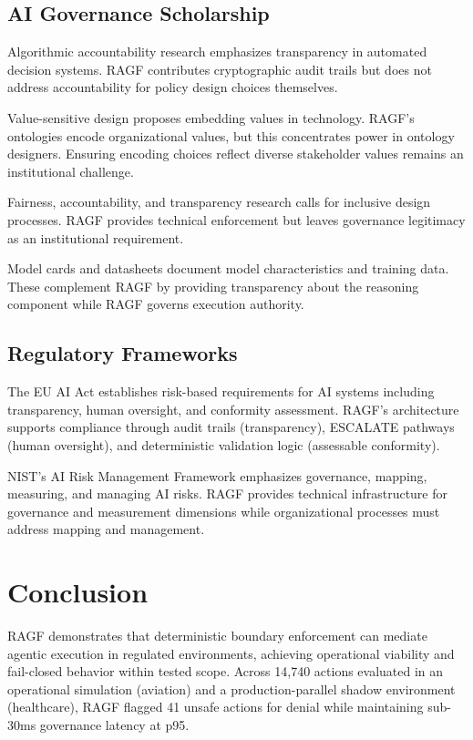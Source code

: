\documentclass[sigconf,nonacm]{acmart}
\begin{document}
\subsection{AI Governance Scholarship}

Algorithmic accountability research \cite{diakopoulos2016accountability, raji2020closing} emphasizes transparency in automated decision systems. RAGF contributes cryptographic audit trails but does not address accountability for policy design choices themselves.

Value-sensitive design \cite{friedman2019value} proposes embedding values in technology. RAGF's ontologies encode organizational values, but this concentrates power in ontology designers. Ensuring encoding choices reflect diverse stakeholder values remains an institutional challenge.

Fairness, accountability, and transparency research \cite{selbst2019fairness} calls for inclusive design processes. RAGF provides technical enforcement but leaves governance legitimacy as an institutional requirement.

Model cards \cite{mitchell2019model} and datasheets \cite{gebru2021datasheets} document model characteristics and training data. These complement RAGF by providing transparency about the reasoning component while RAGF governs execution authority.

\subsection{Regulatory Frameworks}

The EU AI Act \cite{euaiact2024} establishes risk-based requirements for AI systems including transparency, human oversight, and conformity assessment. RAGF's architecture supports compliance through audit trails (transparency), ESCALATE pathways (human oversight), and deterministic validation logic (assessable conformity).

NIST's AI Risk Management Framework \cite{nist2023ai} emphasizes governance, mapping, measuring, and managing AI risks. RAGF provides technical infrastructure for governance and measurement dimensions while organizational processes must address mapping and management.

\section{Conclusion}

RAGF demonstrates that deterministic boundary enforcement can mediate agentic execution in regulated environments, achieving operational viability and fail-closed behavior within tested scope. Across 14,740 actions evaluated in an operational simulation (aviation) and a production-parallel shadow environment (healthcare), RAGF flagged 41 unsafe actions for denial while maintaining sub-30ms governance latency at p95.
\end{document}
